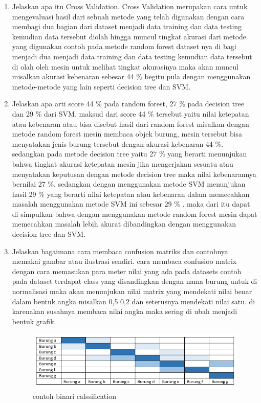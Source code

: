 \begin{enumerate}
\item Jelaskan apa itu Cross Validation.
Cross Validation merupakan cara untuk mengevaluasi hasil dari sebuah metode yang telah digunakan dengan cara membagi dua bagian dari dataset menjadi data training dan data testing kemudian data tersebut diolah hingga muncul tingkat akurasi dari metode yang digunakan contoh pada metode random forest dataset nya di bagi menjadi dua menjadi data training dan data testing kemudian data tersebut di olah oleh mesin untuk melihat tingkat akurasinya maka akan muncul misalkan akurasi kebenaran sebesar 44 \% begitu pula dengan menggunakan metode-metode yang lain seperti decision tree dan SVM.


\item Jelaskan apa arti score 44 \% pada random forest, 27 \% pada decision tree dan 29 \% dari SVM.
maksud dari score 44 \% tersebut yaitu nilai ketepatan atau kebenaran atau bisa disebut hasil dari random forest misalkan dengan metode random forest mesin membaca objek burung, mesin tersebut bisa menyatakan jenis burung tersebut dengan akurasi kebenaran 44 \%. sedangkan pada metode decision tree yaitu 27 \% yang berarti menunjukan bahwa tingkat akurasi ketepatan mesin jika mengerjakan sesuatu atau menyatakan keputusan dengan metode decision tree maka nilai kebenarannya bernilai 27 \%. sedangkan dengan menggunakan metode SVM menunjukan hasil 29 \% yang berarti nilai ketepatan atau kebenaran dalam memecahkan masalah menggunakan metode SVM ini sebesar 29 \% . maka dari itu dapat di simpulkan bahwa dengan menggunakan metode random forest mesin dapat memecahkan masalah lebih akurat dibandingkan dengan menggunakan decision tree dan SVM.


\item Jelaskan bagaimana cara membaca confusion matriks dan contohnya memakai gambar atau ilustrasi sendiri.
cara membaca confusioo matrix dengan cara memasukan para meter nilai yang ada pada datasets contoh pada dataset terdapat class yang disandingkan dengan nama burung untuk di normalisasi maka akan menunjukan nilai matrix yang mendekati nilai benar dalam bentuk angka misalkan 0,5 0,2 dan seterusnya mendekati nilai satu. di karenakan susahnya membaca nilai angka maka sering di ubah menjadi bentuk grafik. 
\begin{figure}[ht]
\centering
\includegraphics[scale=0.2]{figures/1174051/3/2.png}
\caption{contoh binari calssification}
\label{contoh}
\end{figure}


\end{enumerate}
